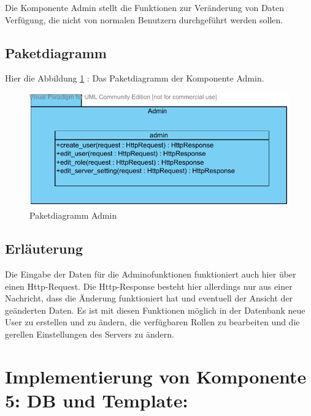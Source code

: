 
Die Komponente Admin stellt die Funktionen zur Veränderung von Daten Verfügung, die nicht von
normalen Benutzern durchgeführt werden sollen.

\subsection{Paketdiagramm}
Hier die Abbildung \ref{fig:PDadmin} : Das Paketdiagramm der Komponente Admin.
\begin{figure}[!htb]
\includegraphics[width=0.8\linewidth]{bilder/Paketdiagramm_admin.pdf}
\caption{Paketdiagramm Admin}
\label{fig:PDadmin}
\end{figure}
\subsection{Erl\"auterung}
Die Eingabe der Daten für die Adminofunktionen funktioniert auch hier über
einen Http-Request. Die Http-Response besteht hier allerdings nur aus einer
Nachricht, dass die Änderung funktioniert hat und eventuell der Ansicht der
geänderten Daten. Es ist mit diesen Funktionen möglich in der Datenbank neue
User zu erstellen und zu ändern, die verfügbaren Rollen zu bearbeiten und die
gerellen Einstellungen des Servers zu ändern. 

\section{Implementierung von Komponente
         5: DB und Template:}



